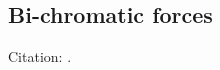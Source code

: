 \documentclass[final,5p,times,twocolumn]{elsarticle}
\begin{document}
\subsection{Bi-chromatic forces}
Citation: \cite{Soding1997}.














\end{document}
